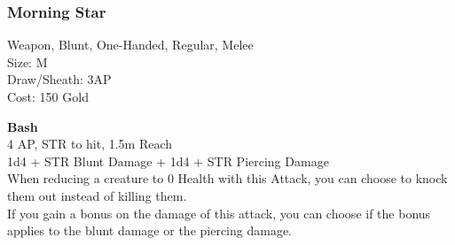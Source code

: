 \subsubsection{Morning Star}\label{weapon:morningStar}
Weapon, Blunt, One-Handed, Regular, Melee\\
Size: M\\
Draw/Sheath: 3AP\\
Cost: 150 Gold

\textbf{Bash}\\
4 AP, STR to hit, 1.5m Reach\\
1d4 + \texttimes STR Blunt Damage + 1d4 + \texttimes STR Piercing Damage\\
When reducing a creature to 0 Health with this Attack, you can choose to knock them out instead of killing them.\\
If you gain a bonus on the damage of this attack, you can choose if the bonus applies to the blunt damage or the piercing damage.